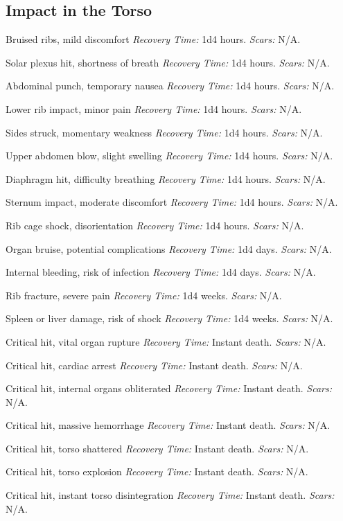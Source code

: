 \documentclass[12pt]{book}  %
\begin{document}
\subsection{Impact in the Torso}

\begin{description}[labelwidth=1.5em, leftmargin=*, itemsep=0.4em]
    \item[1 -] Bruised ribs, mild discomfort \textit{Recovery Time:} 1d4 hours. \textit{Scars:} N/A.
    \item[2 -] Solar plexus hit, shortness of breath \textit{Recovery Time:} 1d4 hours. \textit{Scars:} N/A.
    \item[3 -] Abdominal punch, temporary nausea \textit{Recovery Time:} 1d4 hours. \textit{Scars:} N/A.
    \item[4 -] Lower rib impact, minor pain \textit{Recovery Time:} 1d4 hours. \textit{Scars:} N/A.
    \item[5 -] Sides struck, momentary weakness \textit{Recovery Time:} 1d4 hours. \textit{Scars:} N/A.
    \item[6 -] Upper abdomen blow, slight swelling \textit{Recovery Time:} 1d4 hours. \textit{Scars:} N/A.
    \item[7 -] Diaphragm hit, difficulty breathing \textit{Recovery Time:} 1d4 hours. \textit{Scars:} N/A.
    \item[8 -] Sternum impact, moderate discomfort \textit{Recovery Time:} 1d4 hours. \textit{Scars:} N/A.
    \item[9 -] Rib cage shock, disorientation \textit{Recovery Time:} 1d4 hours. \textit{Scars:} N/A.
    \item[10 -] Organ bruise, potential complications \textit{Recovery Time:} 1d4 days. \textit{Scars:} N/A.
    \item[11 -] Internal bleeding, risk of infection \textit{Recovery Time:} 1d4 days. \textit{Scars:} N/A.
    \item[12 -] Rib fracture, severe pain \textit{Recovery Time:} 1d4 weeks. \textit{Scars:} N/A.
    \item[13 -] Spleen or liver damage, risk of shock \textit{Recovery Time:} 1d4 weeks. \textit{Scars:} N/A.
    \item[14 -] Critical hit, vital organ rupture \textit{Recovery Time:} Instant death. \textit{Scars:} N/A.
    \item[15 -] Critical hit, cardiac arrest \textit{Recovery Time:} Instant death. \textit{Scars:} N/A.
    \item[16 -] Critical hit, internal organs obliterated \textit{Recovery Time:} Instant death. \textit{Scars:} N/A.
    \item[17 -] Critical hit, massive hemorrhage \textit{Recovery Time:} Instant death. \textit{Scars:} N/A.
    \item[18 -] Critical hit, torso shattered \textit{Recovery Time:} Instant death. \textit{Scars:} N/A.
    \item[19 -] Critical hit, torso explosion \textit{Recovery Time:} Instant death. \textit{Scars:} N/A.
    \item[20 -] Critical hit, instant torso disintegration \textit{Recovery Time:} Instant death. \textit{Scars:} N/A.
\end{description}
\end{document}
